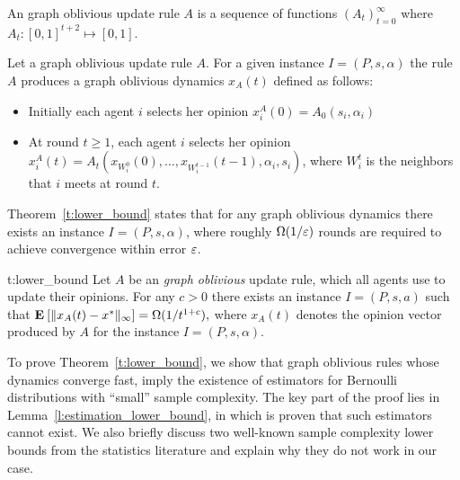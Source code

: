 \begin{definition}\label{d:opinion_dependent_dynamics}
An graph oblivious update rule $A$ is a sequence of
functions $(A_t)_{t=0}^\infty$ where
$A_t: [0,1]^{t+2}\mapsto [0,1]$.
\end{definition}

\begin{definition}\label{d:opinion_dependent_dynamics}
Let a graph oblivious update rule $A$. For a given instance $I=(P,s,\alpha)$
the rule $A$ produces a graph oblivious dynamics $x_A(t)$ defined as follows:
\begin{itemize}
 \item Initially each agent $i$ selects her opinion $x_i^A(0)=A_0(s_i,\alpha_i)$
 \item At round $t\geq 1$, each agent $i$ selects her opinion
   \(x_i^A(t)=A_t(x_{W_i^0}(0),\dots,x_{W_i^{t-1}}(t-1),\alpha_i,s_i)\),
where $W_i^t$ is the neighbors that $i$ meets at round $t$.
\end{itemize}
\end{definition}
Theorem~\ref{t:lower_bound} states that for any graph oblivious dynamics
there exists an instance $I = (P,s,\alpha)$, where roughly $\Omega(1/\varepsilon)$
rounds are required to achieve convergence within error $\varepsilon$.
\begin{reptheorem}{t:lower_bound}
  Let $A$ be an \emph{graph oblivious} update rule, which all agents use to
  update their opinions.  For any $c>0$ there exists an instance $I=(P,s,a)$
  such that
  \(
    \Exp{\norm{\infty}{x_A(t) - x^*}} = \Omega(1/t^{1+c}),
  \)
  where $x_A(t)$ denotes the opinion vector produced by $A$ for the instance
  $I=(P,s,\alpha)$.
\end{reptheorem}
%
To prove Theorem~\ref{t:lower_bound}, we show that 
graph oblivious rules whose dynamics converge fast,
imply the existence of estimators for Bernoulli distributions with
\enquote{small} sample complexity. The key part of the proof lies 
in Lemma~\ref{l:estimation_lower_bound}, in which is proven
that such estimators cannot exist.
We also briefly discuss two well-known sample complexity lower bounds
from the statistics literature and explain why they do not work in our case.

